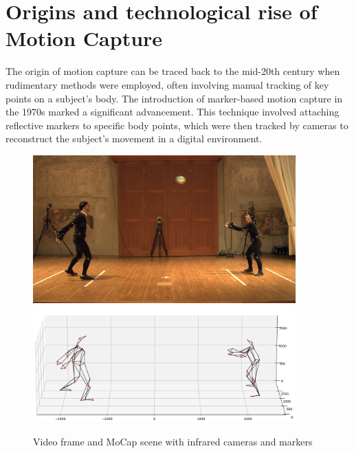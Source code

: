 \section{Origins and technological rise of Motion Capture}
The origin of motion capture can be traced back to the mid-20th century when rudimentary methods were employed, 
often involving manual tracking of key points on a subject's body. 
The introduction of marker-based motion capture in the 1970s marked a significant advancement. 
This technique involved attaching reflective markers to specific body points, 
which were then tracked by cameras to reconstruct the subject's movement in a digital environment. 
\begin{figure}[H]
    \centering
    \includegraphics[width=0.9\textwidth]{graphics/bodyMarkersExampleImage.png}
    \includegraphics[width=0.9\textwidth]{graphics/bodyMarkersExampleMoCap.png}
    \caption{Video frame and MoCap scene with infrared cameras and markers}
    \label{fig:common}
\end{figure}

